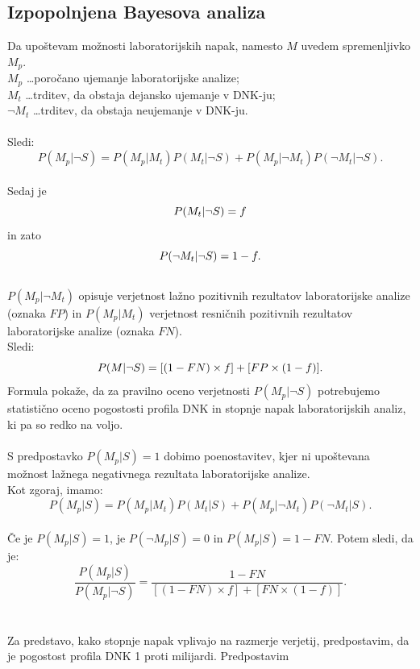 \documentclass[fin1, tisk]{fmfdelo}
\theoremstyle{definition}
\theoremstyle{trditev}
\theoremstyle{izrek}
\begin{document}
\subsection{Izpopolnjena Bayesova analiza}
Da upoštevam možnosti laboratorijskih napak, namesto $M$ uvedem spremenljivko $M_p$.\\
$M_p$ \dots poročano ujemanje laboratorijske analize; \\
$M_t$ \dots trditev, da obstaja dejansko ujemanje v DNK-ju;\\
$\neg M_t$ \dots trditev, da obstaja neujemanje v DNK-ju.\\\\
Sledi:
\[
   P(M_p \lvert \neg S) = P(M_p \lvert M_t)P(M_t \lvert \neg S) + P(M_p \lvert \neg M_t)P(\neg M_t \lvert \neg S).
\]\\
Sedaj je 
\[
    P(M_t \lvert \neg S) = f \vspace{2mm}
\] 
in zato 
\[
    P(\neg M_t \lvert \neg S) = 1-f. \vspace{2mm}
\]\\
$P(M_p \lvert \neg M_t)$ opisuje verjetnost lažno pozitivnih rezultatov laboratorijske analize (oznaka $FP$) in $P(M_p \lvert M_t)$ verjetnost resničnih 
pozitivnih rezultatov laboratorijske analize (oznaka $FN$).\\
Sledi:
\[
   P(M \lvert \neg S) = [(1 - FN) \times f] + [FP \times (1 - f)]. \vspace{2mm}
\]
Formula pokaže, da za pravilno oceno verjetnosti $P(M_p \lvert \neg S)$ potrebujemo statistično oceno pogostosti profila DNK in stopnje napak
laboratorijskih analiz, ki pa so redko na voljo.\\\\
S predpostavko $P(M_p \lvert S) = 1$ dobimo poenostavitev, kjer ni upoštevana možnost lažnega negativnega rezultata laboratorijske analize. \\
Kot zgoraj, imamo:
\[
   P(M_p \lvert S) = P(M_p \lvert M_t)P(M_t \lvert S) + P(M_p \lvert \neg M_t)P(\neg M_t \lvert S).
\]\\
Če je $P(M_p \lvert S) = 1$, je $P(\neg M_p \lvert S) = 0$ in $P(M_p \lvert S) = 1 - FN$. Potem sledi, da je:
\[
   \frac{P(M_p \lvert S)}{P(M_p \lvert \neg S)} = \frac{1 - FN}{[(1 - FN) \times f] + [FN \times (1 - f)]}. 
\]\\\\
Za predstavo, kako stopnje napak vplivajo na razmerje verjetij, predpostavim, da je pogostost profila DNK 1 proti milijardi. Predpostavim
\end{document}
